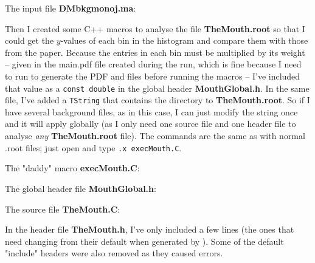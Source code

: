 The input file \textbf{DMbkgmonoj.ma}:



Then I created some C++ macros to analyse the file \textbf{TheMouth.root} so that I could get the $y$-values of each bin in the \etmiss histogram and compare them with those from the paper. Because the entries in each bin must be multiplied by its weight -- given in the main.pdf file created during the \madanalysis run, which is fine because I need to run \madanalysis to generate the PDF and \ROOT files before running the macros -- I've included that value as a \texttt{const double} in the global header \textbf{MouthGlobal.h}. In the same file, I've added a \texttt{TString} that contains the directory to \textbf{TheMouth.root}. So if I have several background files, as in this case, I can just modify the string once and it will apply globally (as I only need one source file and one header file to analyse \emph{any} \textbf{TheMouth.root} file). The commands are the same as with normal .root files; just open \ROOT and type \verb!.x execMouth.C!.

The "daddy" macro \textbf{execMouth.C}:



The global header file \textbf{MouthGlobal.h}:



The source file \textbf{TheMouth.C}:



In the header file \textbf{TheMouth.h}, I've only included a few lines (the ones that need changing from their default when generated by \ROOT). Some of the default "include" headers were also removed as they caused errors.




